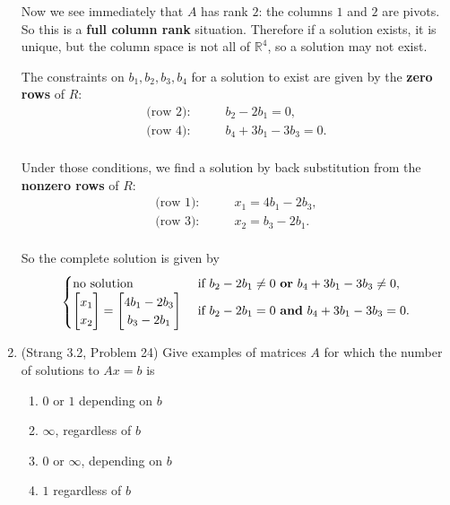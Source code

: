 \documentclass[11pt]{article}
\newcommand{\rr}{\mathbb{R}}
\begin{document}
\begin{enumerate}
Now we see immediately that $A$ has rank $2$: the columns $1$ and $2$ are pivots.  So this is a \textbf{full column rank} situation.  Therefore if a solution exists, it is unique, but the column space is not all of $\rr^4$, so a solution may not exist. 

The constraints on $b_1, b_2, b_3, b_4$ for a solution to exist are given by the \textbf{zero rows} of $R$:
\begin{align*}
 \text{(row 2):} & \qquad b_2 - 2b_1 = 0,\\
  \text{(row 4):} & \qquad b_4 + 3b_1 - 3b_3 = 0.\\
\end{align*}

Under those conditions, we find a solution by back substitution from the \textbf{nonzero rows} of $R$:
\begin{align*}
 \text{(row 1):} & \qquad x_1 = 4b_1 - 2b_3,\\
  \text{(row 3):} & \qquad x_2 = b_3 - 2b_1.\\
\end{align*}

So the complete solution is given by
\[ \begin{cases} \text{no solution} & \ \text{if $b_2 - 2b_1 \neq 0$ \textbf{or} $b_4 + 3b_1 - 3b_3 \neq 0$,} \\ \begin{bmatrix} x_1 \\ x_2 \end{bmatrix} = \begin{bmatrix} 4b_1 - 2b_3 \\ b_3 - 2b_1 \end{bmatrix} & \ \text{if $b_2 - 2b_1 = 0$ \textbf{and} $b_4 + 3b_1 - 3b_3 = 0$.} \end{cases} \]


\item (Strang 3.2, Problem 24) Give examples of matrices $A$ for which the number of solutions to $Ax = b$ is
\begin{enumerate}

\item $0$ or $1$ depending on $b$
\item $\infty$, regardless of $b$
\item $0$ or $\infty$, depending on $b$
\item $1$ regardless of $b$

\end{enumerate}


\end{enumerate}
\end{document}
